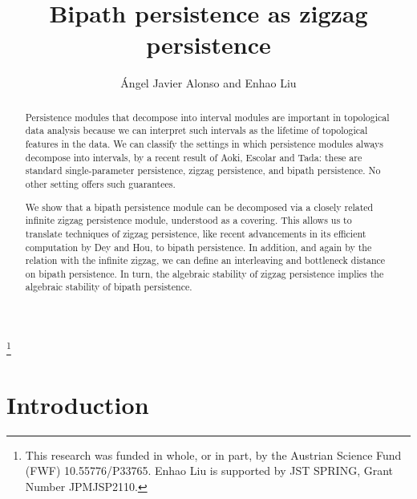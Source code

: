 \documentclass[a4paper,english,reqno]{amsart}
\theoremstyle{plain}
\theoremstyle{definition} %
\begin{document}
\title{Bipath persistence as zigzag persistence}
\author{{\'A}ngel Javier Alonso and Enhao Liu}

\begin{abstract}
Persistence modules that decompose into interval modules are important in topological data analysis because we can interpret such intervals as the lifetime of topological features in the data. We can classify the settings in which persistence modules always decompose into intervals, by a recent result of Aoki, Escolar and Tada: these are standard single-parameter persistence, zigzag persistence, and bipath persistence. No other setting offers such guarantees.
  
We show that a bipath persistence module can be decomposed via a closely related infinite zigzag persistence module, understood as a covering. This allows us to translate techniques of zigzag persistence, like recent advancements in its efficient computation by Dey and Hou, to bipath persistence. In addition, and again by the relation with the infinite zigzag, we can define an interleaving and bottleneck distance on bipath persistence. In turn, the algebraic stability of zigzag persistence implies the algebraic stability of bipath persistence.
\end{abstract}

\makeatletter
{}
\makeatother
\thanks{This research was funded in
whole, or in part, by the Austrian Science Fund (FWF) 10.55776/P33765. Enhao Liu is supported by JST SPRING, Grant Number JPMJSP2110.
}

\address{Institute of Geometry, Graz University of Technology, Graz, Austria}

\address{
Department of Mathematics, Kyoto University,
Kitashirakawa Oiwake-cho, Sakyo-ku, Kyoto 606-8502, 
Japan.
}

\maketitle


\section{Introduction}\label{sec:introduction}
\end{document}
